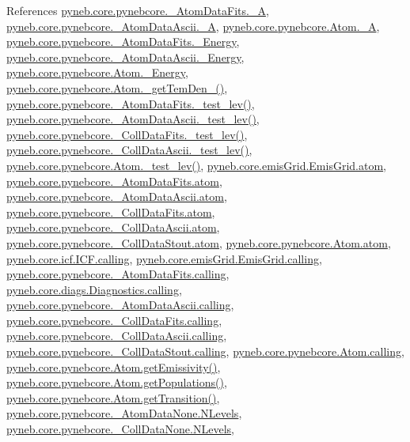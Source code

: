 References \hyperlink{pynebcore_8py_source_l00100}{pyneb.\-core.\-pynebcore.\-\_\-\-Atom\-Data\-Fits.\-\_\-\-A}, \hyperlink{pynebcore_8py_source_l00415}{pyneb.\-core.\-pynebcore.\-\_\-\-Atom\-Data\-Ascii.\-\_\-\-A}, \hyperlink{pynebcore_8py_source_l01319}{pyneb.\-core.\-pynebcore.\-Atom.\-\_\-\-A}, \hyperlink{pynebcore_8py_source_l00101}{pyneb.\-core.\-pynebcore.\-\_\-\-Atom\-Data\-Fits.\-\_\-\-Energy}, \hyperlink{pynebcore_8py_source_l00413}{pyneb.\-core.\-pynebcore.\-\_\-\-Atom\-Data\-Ascii.\-\_\-\-Energy}, \hyperlink{pynebcore_8py_source_l01320}{pyneb.\-core.\-pynebcore.\-Atom.\-\_\-\-Energy}, \hyperlink{pynebcore_8py_source_l01869}{pyneb.\-core.\-pynebcore.\-Atom.\-\_\-get\-Tem\-Den\-\_()}, \hyperlink{pynebcore_8py_source_l00178}{pyneb.\-core.\-pynebcore.\-\_\-\-Atom\-Data\-Fits.\-\_\-test\-\_\-lev()}, \hyperlink{pynebcore_8py_source_l00447}{pyneb.\-core.\-pynebcore.\-\_\-\-Atom\-Data\-Ascii.\-\_\-test\-\_\-lev()}, \hyperlink{pynebcore_8py_source_l00677}{pyneb.\-core.\-pynebcore.\-\_\-\-Coll\-Data\-Fits.\-\_\-test\-\_\-lev()}, \hyperlink{pynebcore_8py_source_l01045}{pyneb.\-core.\-pynebcore.\-\_\-\-Coll\-Data\-Ascii.\-\_\-test\-\_\-lev()}, \hyperlink{pynebcore_8py_source_l01525}{pyneb.\-core.\-pynebcore.\-Atom.\-\_\-test\-\_\-lev()}, \hyperlink{emis_grid_8py_source_l00051}{pyneb.\-core.\-emis\-Grid.\-Emis\-Grid.\-atom}, \hyperlink{pynebcore_8py_source_l00089}{pyneb.\-core.\-pynebcore.\-\_\-\-Atom\-Data\-Fits.\-atom}, \hyperlink{pynebcore_8py_source_l00310}{pyneb.\-core.\-pynebcore.\-\_\-\-Atom\-Data\-Ascii.\-atom}, \hyperlink{pynebcore_8py_source_l00576}{pyneb.\-core.\-pynebcore.\-\_\-\-Coll\-Data\-Fits.\-atom}, \hyperlink{pynebcore_8py_source_l00926}{pyneb.\-core.\-pynebcore.\-\_\-\-Coll\-Data\-Ascii.\-atom}, \hyperlink{pynebcore_8py_source_l01162}{pyneb.\-core.\-pynebcore.\-\_\-\-Coll\-Data\-Stout.\-atom}, \hyperlink{pynebcore_8py_source_l01218}{pyneb.\-core.\-pynebcore.\-Atom.\-atom}, \hyperlink{icf_8py_source_l00016}{pyneb.\-core.\-icf.\-I\-C\-F.\-calling}, \hyperlink{emis_grid_8py_source_l00044}{pyneb.\-core.\-emis\-Grid.\-Emis\-Grid.\-calling}, \hyperlink{pynebcore_8py_source_l00097}{pyneb.\-core.\-pynebcore.\-\_\-\-Atom\-Data\-Fits.\-calling}, \hyperlink{diags_8py_source_l00169}{pyneb.\-core.\-diags.\-Diagnostics.\-calling}, \hyperlink{pynebcore_8py_source_l00318}{pyneb.\-core.\-pynebcore.\-\_\-\-Atom\-Data\-Ascii.\-calling}, \hyperlink{pynebcore_8py_source_l00585}{pyneb.\-core.\-pynebcore.\-\_\-\-Coll\-Data\-Fits.\-calling}, \hyperlink{pynebcore_8py_source_l00936}{pyneb.\-core.\-pynebcore.\-\_\-\-Coll\-Data\-Ascii.\-calling}, \hyperlink{pynebcore_8py_source_l01156}{pyneb.\-core.\-pynebcore.\-\_\-\-Coll\-Data\-Stout.\-calling}, \hyperlink{pynebcore_8py_source_l01229}{pyneb.\-core.\-pynebcore.\-Atom.\-calling}, \hyperlink{pynebcore_8py_source_l01782}{pyneb.\-core.\-pynebcore.\-Atom.\-get\-Emissivity()}, \hyperlink{pynebcore_8py_source_l01562}{pyneb.\-core.\-pynebcore.\-Atom.\-get\-Populations()}, \hyperlink{pynebcore_8py_source_l01472}{pyneb.\-core.\-pynebcore.\-Atom.\-get\-Transition()}, \hyperlink{pynebcore_8py_source_l00069}{pyneb.\-core.\-pynebcore.\-\_\-\-Atom\-Data\-None.\-N\-Levels}, \hyperlink{pynebcore_8py_source_l00082}{pyneb.\-core.\-pynebcore.\-\_\-\-Coll\-Data\-None.\-N\-Levels}, 